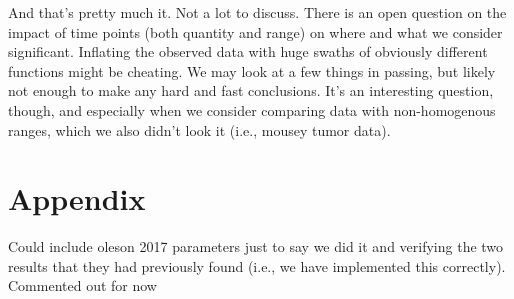 \documentclass{article}
\begin{document}
And that's pretty much it. Not a lot to discuss. There is an open question on the impact of time points (both quantity and range) on where and what we consider significant. Inflating the observed data with huge swaths of obviously different functions might be cheating. We may look at a few things in passing, but likely not enough to make any hard and fast conclusions. It's an interesting question, though, and especially when we consider comparing data with non-homogenous ranges, which we also didn't look it (i.e., mousey tumor data). 





\section*{Appendix}

Could include oleson 2017 parameters just to say we did it and verifying the two results that they had previously found (i.e., we have implemented this correctly). Commented out for now
\end{document}
